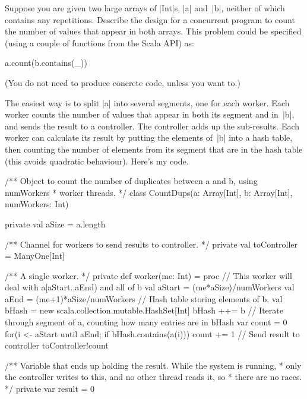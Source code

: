 \begin{nontutequestion}
Suppose you are given two large arrays of |Int|s, |a| and~|b|, neither
of which contains any repetitions.  Describe the design for a
concurrent program to count the number of values that appear in both
arrays.  This problem could be specified (using a couple of functions
from the Scala API) as:
\begin{scala}
  a.count(b.contains(_))
\end{scala}
(You do not need to produce concrete code, unless you want to.)

\end{nontutequestion}


\begin{nontuteanswer}
The easiest way is to split |a| into several segments, one for each worker.
Each worker counts the number of values that appear in both its segment and
in~|b|, and sends the result to a controller.  The controller adds up the
sub-results.  Each worker can calculate its result by putting the elements
of~|b| into a hash table, then counting the number of elements from its
segment that are in the hash table (this avoids quadratic behaviour).  Here's
my code.
%
\begin{scala}
/** Object to count the number of duplicates between a and b, using numWorkers
  * worker threads. */
class CountDups(a: Array[Int], b: Array[Int], numWorkers: Int){
  private val aSize = a.length

  /** Channel for workers to send results to controller. */
  private val toController = ManyOne[Int]

  /** A single worker. */
  private def worker(me: Int) = proc{
    // This worker will deal with a[aStart..aEnd) and all of b
    val aStart = (me*aSize)/numWorkers
    val aEnd = (me+1)*aSize/numWorkers
    // Hash table storing elements of b.
    val bHash = new scala.collection.mutable.HashSet[Int]
    bHash ++= b
    // Iterate through segment of a, counting how many entries are in bHash
    var count = 0
    for(i <- aStart until aEnd; if bHash.contains(a(i))) count += 1 
    // Send result to controller
    toController!count
  }

  /** Variable that ends up holding the result.  While the system is running,
    * only the controller writes to this, and no other thread reads it, so
    * there are no races. */
  private var result = 0

}
\end{scala}
\end{nontuteanswer}
